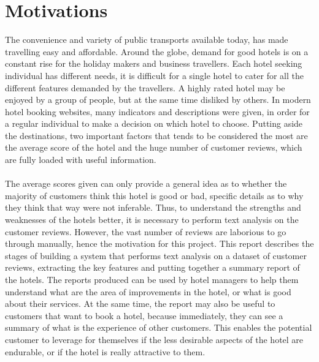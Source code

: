 \documentclass[a4paper]{report}
\begin{document}
\section{Motivations}
The convenience and variety of public transports available today, has made travelling easy and affordable. Around the globe, demand for good hotels is on a constant rise for the holiday makers and business travellers. Each hotel seeking individual has different needs, it is difficult for a single hotel to cater for all the different features demanded by the travellers. A highly rated hotel may be enjoyed by a group of people, but at the same time disliked by others. In modern hotel booking websites, many indicators and descriptions were given, in order for a regular individual to make a decision on which hotel to choose. Putting aside the destinations, two important factors that tends to be considered the most are the average score of the hotel and the huge number of customer reviews, which are fully loaded with useful information.
\\\\
The average scores given can only provide a general idea as to whether the majority of customers think this hotel is good or bad, specific details as to why they think that way were not inferable. Thus, to understand the strengths and weaknesses of the hotels better, it is necessary to perform text analysis on the customer reviews. However, the vast number of reviews are laborious to go through manually, hence the motivation for this project. This report describes the stages of building a system that performs text analysis on a dataset of customer reviews, extracting the key features and putting together a summary report of the hotels. The reports produced can be used by hotel managers to help them understand what are the area of improvements in the hotel, or what is good about their services. At the same time, the report may also be useful to customers that want to book a hotel, because immediately, they can see a summary of what is the experience of other customers. This enables the potential customer to leverage for themselves if the less desirable aspects of the hotel are endurable, or if the hotel is really attractive to them.
\end{document}

